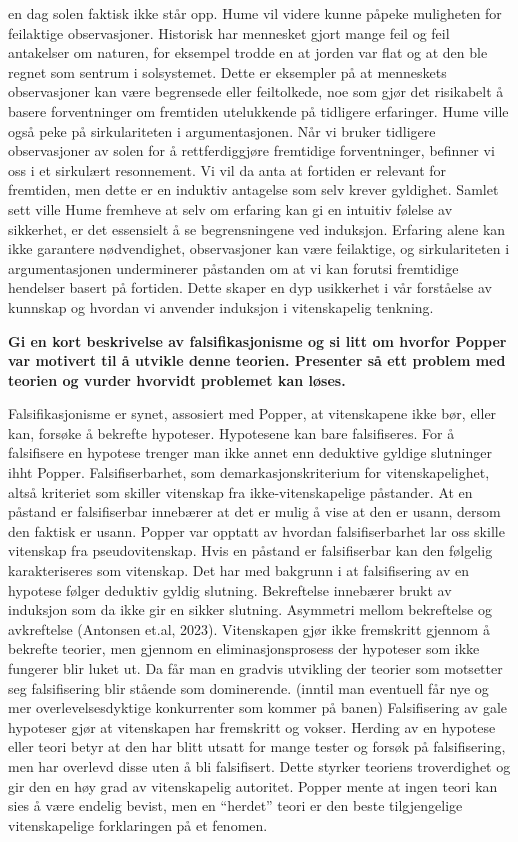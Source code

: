\documentclass[
  letterpaper,
  DIV=11,
  numbers=noendperiod]{scrreprt}
\begin{document}
en dag solen faktisk ikke står opp. Hume vil videre kunne påpeke
muligheten for feilaktige observasjoner. Historisk har mennesket gjort
mange feil og feil antakelser om naturen, for eksempel trodde en at
jorden var flat og at den ble regnet som sentrum i solsystemet. Dette er
eksempler på at menneskets observasjoner kan være begrensede eller
feiltolkede, noe som gjør det risikabelt å basere forventninger om
fremtiden utelukkende på tidligere erfaringer. Hume ville også peke på
sirkulariteten i argumentasjonen. Når vi bruker tidligere observasjoner
av solen for å rettferdiggjøre fremtidige forventninger, befinner vi oss
i et sirkulært resonnement. Vi vil da anta at fortiden er relevant for
fremtiden, men dette er en induktiv antagelse som selv krever gyldighet.
Samlet sett ville Hume fremheve at selv om erfaring kan gi en intuitiv
følelse av sikkerhet, er det essensielt å se begrensningene ved
induksjon. Erfaring alene kan ikke garantere nødvendighet, observasjoner
kan være feilaktige, og sirkulariteten i argumentasjonen underminerer
påstanden om at vi kan forutsi fremtidige hendelser basert på fortiden.
Dette skaper en dyp usikkerhet i vår forståelse av kunnskap og hvordan
vi anvender induksjon i vitenskapelig tenkning.

\textbf{Gi en kort beskrivelse av falsifikasjonisme og si litt om
hvorfor Popper var motivert til å utvikle denne teorien. Presenter så
ett problem med teorien og vurder hvorvidt problemet kan løses.}

Falsifikasjonisme er synet, assosiert med Popper, at vitenskapene ikke
bør, eller kan, forsøke å bekrefte hypoteser. Hypotesene kan bare
falsifiseres. For å falsifisere en hypotese trenger man ikke annet enn
deduktive gyldige slutninger ihht Popper. Falsifiserbarhet, som
demarkasjonskriterium for vitenskapelighet, altså kriteriet som skiller
vitenskap fra ikke-vitenskapelige påstander. At en påstand er
falsifiserbar innebærer at det er mulig å vise at den er usann, dersom
den faktisk er usann. Popper var opptatt av hvordan falsifiserbarhet lar
oss skille vitenskap fra pseudovitenskap. Hvis en påstand er
falsifiserbar kan den følgelig karakteriseres som vitenskap. Det har med
bakgrunn i at falsifisering av en hypotese følger deduktiv gyldig
slutning. Bekreftelse innebærer brukt av induksjon som da ikke gir en
sikker slutning. Asymmetri mellom bekreftelse og avkreftelse (Antonsen
et.al, 2023). Vitenskapen gjør ikke fremskritt gjennom å bekrefte
teorier, men gjennom en eliminasjonsprosess der hypoteser som ikke
fungerer blir luket ut. Da får man en gradvis utvikling der teorier som
motsetter seg falsifisering blir stående som dominerende. (inntil man
eventuell får nye og mer overlevelsesdyktige konkurrenter som kommer på
banen) Falsifisering av gale hypoteser gjør at vitenskapen har
fremskritt og vokser. Herding av en hypotese eller teori betyr at den
har blitt utsatt for mange tester og forsøk på falsifisering, men har
overlevd disse uten å bli falsifisert. Dette styrker teoriens
troverdighet og gir den en høy grad av vitenskapelig autoritet. Popper
mente at ingen teori kan sies å være endelig bevist, men en ``herdet''
teori er den beste tilgjengelige vitenskapelige forklaringen på et
fenomen.
\end{document}
